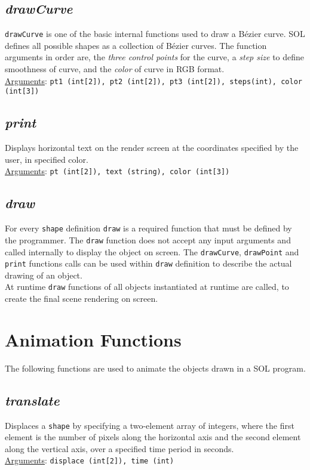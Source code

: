     \subsection{\textit{drawCurve}}
    \texttt{drawCurve} is one of the basic internal functions used to draw a B\'ezier curve. SOL defines all possible shapes as a collection of B\'ezier curves. The function arguments in order are, the \textit{three control points} for the curve, a \textit{step size} to define smoothness of curve, and the \textit{color} of curve in RGB format.\\
    \underline{Arguments}: \texttt{pt1 (int[2]), pt2 (int[2]), pt3 (int[2]), steps(int), color (int[3])}

    \subsection{\textit{print}}
    Displays horizontal text on the render screen at the coordinates specified by the user, in specified color.\\
    \underline{Arguments}: \texttt{pt (int[2]), text (string), color (int[3])}

    \subsection{\textit{draw}}
    For every \texttt{shape} definition \texttt{draw} is a required function that must be defined by the programmer. The \texttt{draw} function does not accept any input arguments and called internally to display the object on screen. The \texttt{drawCurve}, \texttt{drawPoint} and \texttt{print} functions calls can be used within \texttt{draw} definition to describe the actual drawing of an object.\\
    At runtime \texttt{draw} functions of all objects instantiated at runtime are called, to create the final scene rendering on screen.

\section{Animation Functions} \label{animation}
The following functions are used to animate the objects drawn in a SOL program.

    \subsection{\textit{translate}}
    Displaces a \texttt{shape} by specifying a two-element array of integers, where the first element is the number of pixels along the horizontal axis and the second element along the vertical axis, over a specified time period in seconds.\\
    \underline{Arguments}: \texttt{displace (int[2]), time (int)}

